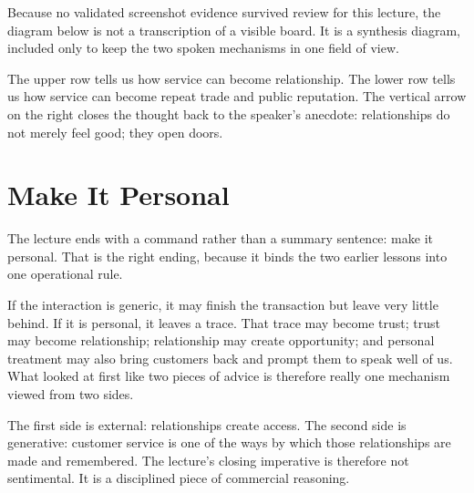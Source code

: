 Because no validated screenshot evidence survived review for this lecture, the diagram below is not a transcription of a visible board. It is a synthesis diagram, included only to keep the two spoken mechanisms in one field of view.

\begin{figure}[h]
\centering
{}
\end{figure}

The upper row tells us how service can become relationship. The lower row tells us how service can become repeat trade and public reputation. The vertical arrow on the right closes the thought back to the speaker's anecdote: relationships do not merely feel good; they open doors.

\section{Make It Personal}

The lecture ends with a command rather than a summary sentence: make it personal. That is the right ending, because it binds the two earlier lessons into one operational rule.

If the interaction is generic, it may finish the transaction but leave very little behind. If it is personal, it leaves a trace. That trace may become trust; trust may become relationship; relationship may create opportunity; and personal treatment may also bring customers back and prompt them to speak well of us. What looked at first like two pieces of advice is therefore really one mechanism viewed from two sides.

The first side is external: relationships create access. The second side is generative: customer service is one of the ways by which those relationships are made and remembered. The lecture's closing imperative is therefore not sentimental. It is a disciplined piece of commercial reasoning.


